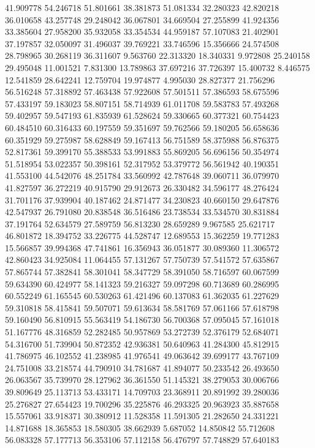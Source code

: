 41.909778
54.246718
51.801661
38.381873
51.081334
32.280323
42.820218
36.010658
43.257748
29.248042
36.067801
34.669504
27.255899
41.924356
33.385604
27.958200
35.932058
33.354534
44.959187
57.107083
21.402901
37.197857
32.050097
31.496037
39.769221
33.746596
15.356666
24.574508
28.798965
30.268119
36.311607
9.563760
22.313320
18.340331
9.972808
25.240158
29.495048
11.001521
7.831300
13.789863
37.697216
37.726397
15.400732
8.446575
12.541859
28.642241
12.759704
19.974877
4.995030
28.827377
21.756296
56.516248
57.318892
57.463438
57.922608
57.501511
57.386593
58.675596
57.433197
59.183023
58.807151
58.714939
61.011708
59.583783
57.493268
59.402957
59.547193
61.835939
61.528624
59.330665
60.377321
60.754423
60.484510
60.316433
60.197559
59.351697
59.762566
59.180205
56.658636
60.351929
59.275987
58.628849
59.167413
56.751589
58.375988
56.876375
52.817361
59.399170
55.388533
53.991883
55.869205
56.696156
50.354974
51.518954
53.022357
50.398161
52.317952
53.379772
56.561942
40.190351
41.553100
44.542076
48.251784
33.560992
42.787648
39.060711
36.079970
41.827597
36.272219
40.915790
29.912673
26.330482
34.596177
48.276424
31.701176
37.939904
40.187462
24.871477
34.230823
40.660150
29.647876
42.547937
26.791080
20.838548
36.516486
23.738534
33.534570
30.831884
37.191764
52.634579
27.589759
56.813230
28.659289
9.967585
25.621717
46.801872
18.394752
33.226775
44.528747
12.689553
15.362259
19.771283
15.566857
39.994368
47.741861
16.356943
36.051877
30.089360
11.306572
42.860423
34.925084
11.064455
57.131267
57.750739
57.541572
57.635867
57.865744
57.382841
58.301041
58.347729
58.391050
58.716597
60.067599
59.634390
60.424977
58.141323
59.216327
59.097298
60.713689
60.286995
60.552249
61.165545
60.530263
61.421496
60.137083
61.362035
61.227629
59.310818
58.415841
59.507071
59.613634
58.581769
57.061166
57.618798
59.160490
56.810915
55.563419
54.186730
56.700368
57.095045
57.161018
51.167776
48.316859
52.282485
50.957869
53.272739
52.376179
52.684071
54.316700
51.739904
50.872352
42.936381
50.640963
41.284300
45.812915
41.786975
46.102552
41.238985
41.976541
49.063642
39.699177
43.767109
24.751008
33.218574
44.790910
34.781687
41.894077
50.233542
26.493650
26.063567
35.739970
28.127962
36.361550
51.145321
38.279053
30.006766
39.809649
25.113713
53.433171
14.709703
23.368911
20.891992
39.280036
25.276827
27.654423
19.700296
35.225876
46.293325
20.963923
35.887658
15.557061
33.918371
30.380912
11.528358
11.591305
21.282650
24.331221
14.871688
18.365853
18.580305
38.662939
5.687052
14.850842
55.712608
56.083328
57.177713
56.353106
57.112158
56.476797
57.748829
57.640183

